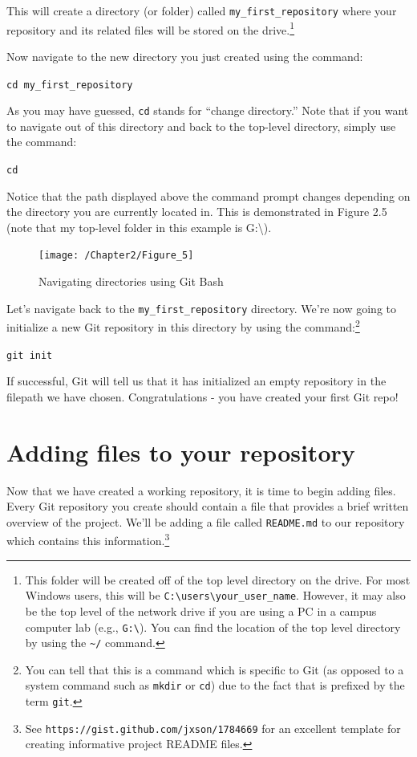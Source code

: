 \documentclass{book}
\begin{document}
This will create a directory (or folder) called \texttt{my\_first\_repository} where your repository and its related files will be stored on the drive.\footnote{This folder will be created off of the top level directory on the drive. For most Windows users, this will be \texttt{C:\textbackslash users\textbackslash your\_user\_name}. However, it may also be the top level of the network drive if you are using a PC in a campus computer lab (e.g., \texttt{G:\textbackslash}). You can find the location of the top level directory by using the \texttt{\textasciitilde/} command.}

Now navigate to the new directory you just created using the command:

\texttt{cd my\_first\_repository}

As you may have guessed, \texttt{cd} stands for ``change directory.'' Note that if you want to navigate out of this directory and back to the top-level directory, simply use the command:

\texttt{cd}

Notice that the path displayed above the command prompt changes depending on the directory you are currently located in. This is demonstrated in Figure 2.5 (note that my top-level folder in this example is G:\textbackslash).

\begin{figure}[h]
	\caption{Navigating directories using Git Bash}
	\centering\texttt{[image: /Chapter2/Figure\_5]}
\end{figure}

Let's navigate back to the \texttt{my\_first\_repository} directory. We're now going to initialize a new Git repository in this directory by using the command:{\footnote {You can tell that this is a command which is specific to Git (as opposed to a system command such as \texttt{mkdir} or \texttt{cd}) due to the fact that is prefixed by the term \texttt{git}.}} 

\texttt{git init}

If successful, Git will tell us that it has initialized an empty repository in the filepath we have chosen. Congratulations - you have created your first Git repo!

\section{Adding files to your repository}
Now that we have created a working repository, it is time to begin adding files. Every Git repository you create should contain a file that provides a brief written overview of the project. We'll be adding a file called \texttt{README.md} to our repository which contains this information.\footnote{See \texttt{https://gist.github.com/jxson/1784669} for an excellent template for creating informative project README files.}
\end{document}
